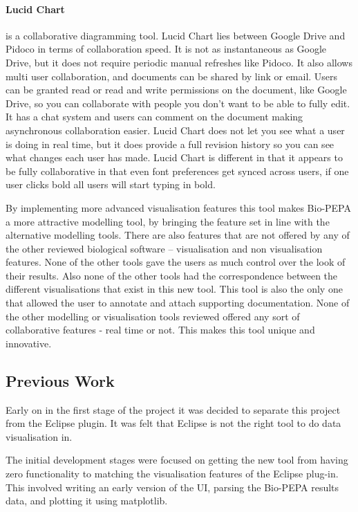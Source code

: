 \paragraph{Lucid Chart} is a collaborative diagramming tool.  Lucid Chart lies between Google Drive and Pidoco in terms of collaboration speed.  It is not as instantaneous as Google Drive, but it does not require periodic manual refreshes like Pidoco.  It also allows multi user collaboration, and documents can be shared by link or email.  Users can be granted read or read and write permissions on the document, like Google Drive, so you can collaborate with people you don't want to be able to fully edit.  It has a chat system and users can comment on the document making asynchronous collaboration easier.  Lucid Chart does not let you see what a user is doing in real time, but it does provide a full revision history so you can see what changes each user has made.  Lucid Chart is different in that it appears to be fully collaborative in that even font preferences get synced across users, if one user clicks bold all users will start typing in bold.

By implementing more advanced visualisation features this tool makes Bio-PEPA a more attractive modelling tool, by bringing the feature set in line with the alternative modelling tools.  There are also features that are not offered by any of the other reviewed biological software -- visualisation and non visualisation features.  None of the other tools gave the users as much control over the look of their results.  Also none of the other tools had the correspondence between the different visualisations that exist in this new tool.  This tool is also the only one that allowed the user to annotate and attach supporting documentation.  None of the other modelling or visualisation tools reviewed offered any sort of collaborative features - real time or not.  This makes this tool unique and innovative.

\subsection{Previous Work}

Early on in the first stage of the project it was decided to separate this project from the Eclipse plugin.  It was felt that Eclipse is not the right tool to do data visualisation in.

The initial development stages were focused on getting the new tool from having zero functionality to matching the visualisation features of the Eclipse plug-in.  This involved writing an early version of the \ac{UI}, parsing the Bio-PEPA results data, and plotting it using matplotlib.

